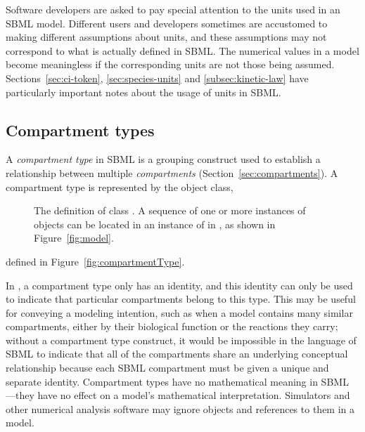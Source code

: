 Software developers are asked to pay special attention to the
units used in an SBML model.  Different users and developers
sometimes are accustomed to making different assumptions about
units, and these assumptions may not correspond to what is
actually defined in SBML.  The numerical values in a model become
meaningless if the corresponding units are not those being
assumed.  Sections~\ref{sec:ci-token}, \ref{sec:species-units} and
\ref{subsec:kinetic-law} have particularly important notes about
the usage of units in SBML.


\subsection{Compartment types}
\label{sec:compartmentType}

A \emph{compartment type} in SBML is a grouping construct used to
establish a relationship between multiple \emph{compartments}
(Section~\ref{sec:compartments}).  A compartment type is
represented by the \CompartmentType object class, 
\begin{figure}
  \centering
  \small
  \caption{The definition of class \CompartmentType.  A
      sequence of one or more instances of \CompartmentType
      objects can be located in an instance of
      \ListOfCompartmentTypes in \Model, as shown in
      Figure~\protect\ref{fig:model}.}
  \label{fig:compartmentType}
\end{figure}
defined in Figure~\vref{fig:compartmentType}.

In \sbmltwothree {}, a compartment type only has an
identity, and this identity can only be used to indicate that
particular compartments belong to this type.  This may be useful
for conveying a modeling intention, such as when a model contains
many similar compartments, either by their biological function or
the reactions they carry; without a compartment type construct, it
would be impossible in the language of SBML to indicate that all
of the compartments share an underlying conceptual relationship
because each SBML compartment must be given a unique and separate
identity.  Compartment types have no mathematical meaning in
SBML \thisLV---they have no effect on a model's
mathematical interpretation.  Simulators and other numerical
analysis software may ignore \CompartmentType objects and
references to them in a model.

